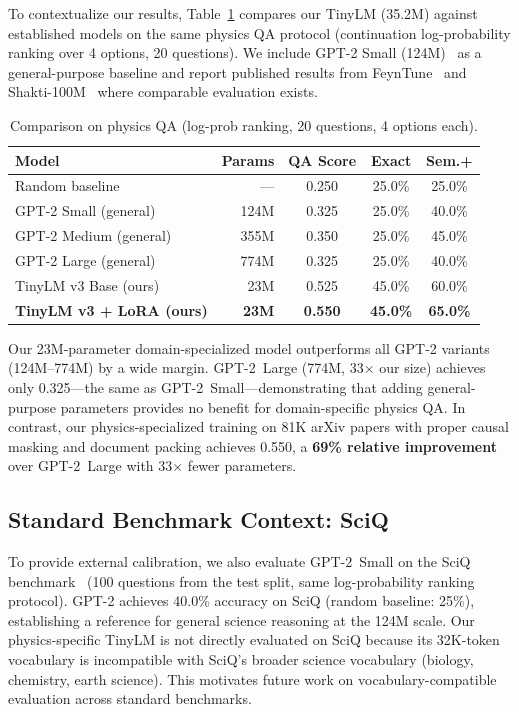 \documentclass[11pt]{article}
\begin{document}
To contextualize our results, Table~\ref{tab:baseline_comparison} compares our TinyLM (35.2M) against established models on the same physics QA protocol (continuation log-probability ranking over 4 options, 20 questions). We include GPT-2 Small (124M)~\cite{karpathy2023nanogpt} as a general-purpose baseline and report published results from FeynTune~\cite{feyntune2025} and Shakti-100M~\cite{shakti2025} where comparable evaluation exists.

\begin{table}[t]
\centering
\caption{Comparison on physics QA (log-prob ranking, 20 questions, 4 options each).}
\label{tab:baseline_comparison}
\begin{tabular}{lrccc}
\toprule
\textbf{Model} & \textbf{Params} & \textbf{QA Score} & \textbf{Exact} & \textbf{Sem.+} \\
\midrule
Random baseline & --- & 0.250 & 25.0\% & 25.0\% \\
GPT-2 Small (general) & 124M & 0.325 & 25.0\% & 40.0\% \\
GPT-2 Medium (general) & 355M & 0.350 & 25.0\% & 45.0\% \\
GPT-2 Large (general) & 774M & 0.325 & 25.0\% & 40.0\% \\
\midrule
TinyLM v3 Base (ours) & 23M & 0.525 & 45.0\% & 60.0\% \\
\textbf{TinyLM v3 + LoRA (ours)} & \textbf{23M} & \textbf{0.550} & \textbf{45.0\%} & \textbf{65.0\%} \\
\bottomrule
\end{tabular}
\end{table}

Our 23M-parameter domain-specialized model outperforms all GPT-2 variants (124M--774M) by a wide margin. GPT-2~Large (774M, 33$\times$ our size) achieves only 0.325---the same as GPT-2~Small---demonstrating that adding general-purpose parameters provides no benefit for domain-specific physics QA. In contrast, our physics-specialized training on 81K arXiv papers with proper causal masking and document packing achieves 0.550, a \textbf{69\% relative improvement} over GPT-2~Large with 33$\times$ fewer parameters.

\subsection{Standard Benchmark Context: SciQ}

To provide external calibration, we also evaluate GPT-2~Small on the SciQ benchmark~\cite{sciq2017} (100 questions from the test split, same log-probability ranking protocol). GPT-2 achieves 40.0\% accuracy on SciQ (random baseline: 25\%), establishing a reference for general science reasoning at the 124M scale. Our physics-specific TinyLM is not directly evaluated on SciQ because its 32K-token vocabulary is incompatible with SciQ's broader science vocabulary (biology, chemistry, earth science). This motivates future work on vocabulary-compatible evaluation across standard benchmarks.
\end{document}
